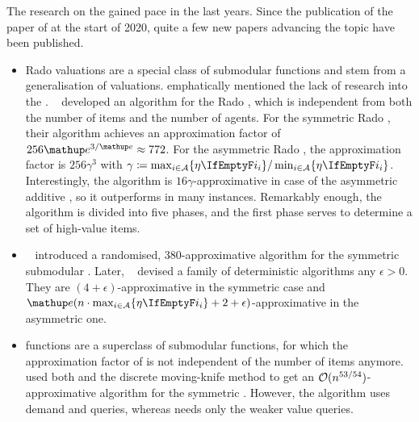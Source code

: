 The research on the \NSW{} gained pace in the last years.
Since the publication of the paper of \citeauthor{APNSWuSVþUM} at the start of 2020, quite a few new papers advancing the topic have been published.
\begin{itemize}[leftmargin=*, nosep]
	\item
	Rado valuations are a special class of submodular functions and stem from a generalisation of \OXS{} valuations.
	 emphatically mentioned the lack of research into the \OXS{} \NSW.
	~\cite{approximating_nsw_under_rado_valuations} developed an algorithm for the Rado \NSW, which is independent from both the number of items and the number of agents.
	For the symmetric Rado \NSW, their algorithm achieves an approximation factor of \(256 \euler^{3/\euler} \approx 772\).
	For the asymmetric Rado \NSW, the approximation factor is \(256 \gamma^3\) with \(\gamma \coloneq \max_{i \in \agents} \braces{\weight} / \min_{i \in \agents} \braces{\weight}\).
	Interestingly, the algorithm is \(16 \gamma\)-approximative in case of the asymmetric additive \NSW, so it outperforms \SMatch{} in many instances.
	Remarkably enough, the algorithm is divided into five phases, and the first phase serves to determine a set of high-value items.

	\item
	\citeauthor{a_constfactor_approx_algo_for_nsw_with_submod_valuations}~\cite{a_constfactor_approx_algo_for_nsw_with_submod_valuations} introduced a randomised, \(380\)-approximative algorithm for the symmetric submodular \NSW.
	Later, \citeauthor{approx_nsw_by_matching_and_local_search}~\cite{approx_nsw_by_matching_and_local_search} devised a family of deterministic algorithms any \(\epsilon > 0\).
	They are \((4+\epsilon)\)-approximative in the symmetric case and \(\euler(n \cdot \max_{i \in \agents} \braces{\weight} + 2 + \epsilon)\)-approximative in the asymmetric one.

	\item
	\XOS{} functions are a superclass of submodular functions, for which the approximation factor of \RepReMatch{} is not independent of the number of items anymore.
	~\cite{sublin_approx_algo_for_nsw_with_xos_valuations} used both \RepReMatch{} and the discrete moving-knife method to get an \(\mathcal{O}(n^{53/54})\)-approximative algorithm for the symmetric \XOS{} \NSW.
	However, the algorithm uses demand and \XOS{} queries, whereas \RepReMatch{} needs only the weaker value queries.


\end{itemize}

